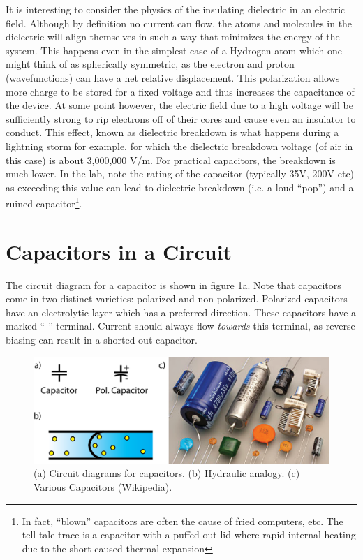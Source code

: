 \documentclass{tufte-book}
\begin{document}
It is interesting to consider the physics of the insulating dielectric in an electric field. Although by definition no current can flow, the atoms and molecules in the dielectric will align themselves in such a way that minimizes the energy of the system. This happens even in the simplest case of a Hydrogen atom which one might think of as spherically symmetric, as the electron and proton (wavefunctions) can have a net relative displacement. This polarization allows more charge to be stored for a fixed voltage and thus increases the capacitance of the device. At some point however, the electric field due to a high voltage will be sufficiently strong to rip electrons off of their cores and cause even an insulator to conduct. This effect, known as dielectric breakdown is what happens during a lightning storm for example, for which the dielectric breakdown voltage (of air in this case) is about 3,000,000 V/m. For practical capacitors, the breakdown is much lower. In the lab, note the rating of the capacitor (typically 35V, 200V etc) as exceeding this value can lead to dielectric breakdown (i.e. a loud ``pop'') and a ruined capacitor\footnote{In fact, ``blown'' capacitors are often the cause of fried computers, etc. The tell-tale trace is a capacitor with a puffed out lid where rapid internal heating due to the short caused thermal expansion}.

\section{Capacitors in a Circuit}

The circuit diagram for a capacitor is shown in figure \ref{fig:capz}a. Note that capacitors come in two distinct varieties: polarized and non-polarized. Polarized capacitors have an electrolytic layer which has a preferred direction. These capacitors have a marked ``-'' terminal. Current should always flow \textit{towards} this terminal, as reverse biasing can result in a shorted out capacitor.


\begin{figure}[h]
\caption{(a) Circuit diagrams for capacitors. (b) Hydraulic analogy. (c) Various Capacitors (Wikipedia).}
\label{fig:capz}
\begin{center}
\includegraphics[width=\textwidth]{capz}
\end{center}
\end{figure}
\end{document}
